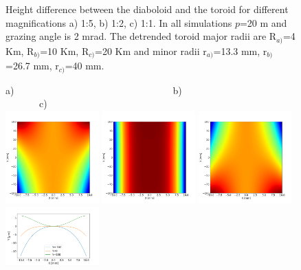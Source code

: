 \documentclass{iucr}              %
\begin{document}
\begin{figure}
\caption{
Height difference between the diaboloid and the toroid for different magnifications a) 1:5, b) 1:2, c) 1:1. In all simulations $p$=20 m and grazing angle is 2 mrad. The detrended toroid major radii are R$_{a)}$=4 Km, R$_{b)}$=10 Km, R$_{c)}$=20 Km and minor radii r$_{a)}$=13.3 mm, r$_{b)}$=26.7 mm, r$_{c)}$=40 mm.
}
\end{figure}

\begin{figure}\label{fig:detrended5mrad}
\flushleft
a)~~~~~~~~~~~~~~~~~~~~~~~~~~~~~~~~~b)~~~~~~~~~~~~~~~~~~~~~~~~~~~~~~c)\\
\centering
\includegraphics[width=0.32\textwidth]{figures/diaboloid_detrended_5mrad_1:5_image.png} 
\includegraphics[width=0.32\textwidth]{figures/diaboloid_detrended_5mrad_1:2_image.png} 
\includegraphics[width=0.32\textwidth]{figures/diaboloid_detrended_5mrad_1:1_image.png} \\
\includegraphics[width=0.32\textwidth]{figures/diaboloid_detrended_5mrad_1:5_profile.png}

\end{figure}
\end{document}
